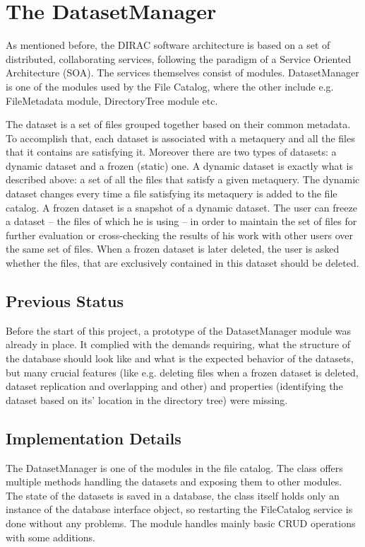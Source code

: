 \chapter{The DatasetManager}
\label{chap:Dataset}

As mentioned before, the DIRAC software architecture is based on a set of distributed,
collaborating services, following the paradigm of a Service
Oriented Architecture (SOA). The services themselves consist of
modules. DatasetManager is one of the modules used by the File Catalog, where the other include
e.g. FileMetadata module, DirectoryTree module etc. 

The dataset is a set of files grouped together based on their common metadata. To accomplish
that, each dataset is associated with a metaquery and all the files that it contains are
satisfying it. Moreover there are two types of datasets: a dynamic dataset and 
a frozen (static) one. A dynamic dataset is exactly what is described above: a set of all the
files that satisfy a given metaquery. The dynamic dataset changes every time a file satisfying
its metaquery is added to the file catalog. A frozen dataset is a snapshot of a dynamic dataset. The
user can freeze a dataset -- the files of which he is using -- in order to maintain the set of files for
further evaluation or cross-checking the results of his work with other users over the same
set of files. When a frozen dataset is later deleted, the user is asked whether the files, that 
are exclusively contained in this dataset should be deleted. 

\section{Previous Status}
Before the start of this project, a prototype of the DatasetManager module was already 
in place. It complied with the demands requiring, what the structure of the database 
should look like and what is the 
expected behavior of the datasets, but many crucial features (like e.g. deleting files when a 
frozen dataset is deleted, dataset replication and overlapping and other) and properties (identifying
the dataset based on its' location in the directory tree) were missing.

\section{Implementation Details}

The DatasetManager is  one of the modules in the file catalog. The class offers
multiple methods handling the datasets and exposing them to other modules. The state of the 
datasets is saved in a database, the class itself holds only an instance of the database interface
object, so restarting the FileCatalog service is done without any problems. The module handles mainly
basic CRUD operations with some additions.

